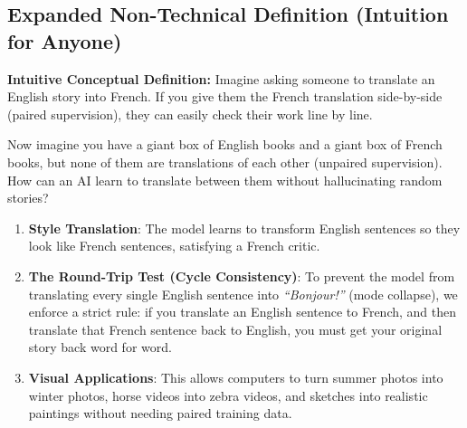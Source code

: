 \documentclass[11pt,a4paper]{article}
\theoremstyle{definition}
\begin{document}
\subsection{Expanded Non-Technical Definition (Intuition for Anyone)}
\textbf{Intuitive Conceptual Definition:}
Imagine asking someone to translate an English story into French. If you give them the French translation side-by-side (paired supervision), they can easily check their work line by line.

Now imagine you have a giant box of English books and a giant box of French books, but none of them are translations of each other (unpaired supervision). How can an AI learn to translate between them without hallucinating random stories?
\begin{enumerate}
    \item \textbf{Style Translation}: The model learns to transform English sentences so they look like French sentences, satisfying a French critic.
    \item \textbf{The Round-Trip Test (Cycle Consistency)}: To prevent the model from translating every single English sentence into \emph{``Bonjour!''} (mode collapse), we enforce a strict rule: if you translate an English sentence to French, and then translate that French sentence back to English, you must get your original story back word for word.
    \item \textbf{Visual Applications}: This allows computers to turn summer photos into winter photos, horse videos into zebra videos, and sketches into realistic paintings without needing paired training data.
\end{enumerate}
\end{document}
